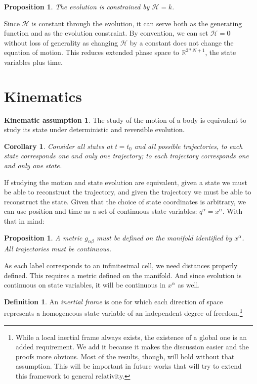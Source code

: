 \documentclass[aps,pra,10pt,twocolumn,floatfix,nofootinbib]{revtex4-1}
\newtheorem{cor}[thm]{Corollary}
\newtheorem{prop}[thm]{Proposition}
\theoremstyle{definition}
\newtheorem{defn}[thm]{Definition}
\newtheorem*{assump3}{Kinematic assumption}
\begin{document}
\begin{prop}\label{tdofConstrain}
The evolution is constrained by $\mathcal{H}=k$.
\end{prop}

Since $\mathcal{H}$ is constant through the evolution, it can serve both as the generating function and as the evolution constraint. By convention, we can set $\mathcal{H}=0$ without loss of generality as changing $\mathcal{H}$ by a constant does not change the equation of motion. This reduces extended phase space to $\mathbb{R}^{2*N + 1}$, the state variables plus time.

\section{Kinematics}
\begin{assump3}\label{kinematicAssumption}
The study of the motion of a body is equivalent to study its state under deterministic and reversible evolution.
\end{assump3}

\begin{cor}\label{}
Consider all states at $t=t_0$ and all possible trajectories, to each state corresponds one and only one trajectory; to each trajectory corresponds one and only one state.
\end{cor}

If studying the motion and state evolution are equivalent, given a state we must be able to reconstruct the trajectory, and given the trajectory we must be able to reconstruct the state. Given that the choice of state coordinates is arbitrary, we can use position and time as a set of continuous state variables: $q^\alpha = x^\alpha$. With that in mind:

\begin{prop}\label{}
A metric $g_{\alpha\beta}$ must be defined on the manifold identified by $x^\alpha$. All trajectories must be continuous.
\end{prop}

As each label corresponds to an infinitesimal cell, we need distances properly defined. This requires a metric defined on the manifold. And since evolution is continuous on state variables, it will be continuous in $x^\alpha$ as well.

\begin{defn}\label{continuousLabels}
An \emph{inertial frame} is one for which each direction of space represents a homogeneous state variable of an independent degree of freedom.\footnote{While a local inertial frame always exists, the existence of a global one is an added requirement. We add it because it makes the discussion easier and the proofs more obvious. Most of the results, though, will hold without that assumption. This will be important in future works that will try to extend this framework to general relativity.}
\end{defn}
\end{document}
